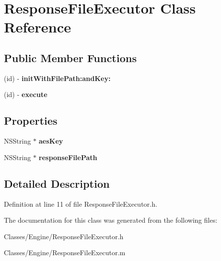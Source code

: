 \hypertarget{interface_response_file_executor}{
\section{ResponseFileExecutor Class Reference}
\label{interface_response_file_executor}
}
\subsection*{Public Member Functions}
\begin{DoxyCompactItemize}
\item 
\hypertarget{interface_response_file_executor_a017a61ea8b0cac97aa8ef94d6a5200d7}{
(id) -\/ {\bfseries initWithFilePath:andKey:}}
\label{interface_response_file_executor_a017a61ea8b0cac97aa8ef94d6a5200d7}

\item 
\hypertarget{interface_response_file_executor_a10369ed42c51e6334d90001418fc7cd1}{
(id) -\/ {\bfseries execute}}
\label{interface_response_file_executor_a10369ed42c51e6334d90001418fc7cd1}

\end{DoxyCompactItemize}
\subsection*{Properties}
\begin{DoxyCompactItemize}
\item 
\hypertarget{interface_response_file_executor_a50dd82b35ed099e4401b87f77552d767}{
NSString $\ast$ {\bfseries aesKey}}
\label{interface_response_file_executor_a50dd82b35ed099e4401b87f77552d767}

\item 
\hypertarget{interface_response_file_executor_a4ff4ee68056e7af595e36c34802843c3}{
NSString $\ast$ {\bfseries responseFilePath}}
\label{interface_response_file_executor_a4ff4ee68056e7af595e36c34802843c3}

\end{DoxyCompactItemize}


\subsection{Detailed Description}


Definition at line 11 of file ResponseFileExecutor.h.



The documentation for this class was generated from the following files:\begin{DoxyCompactItemize}
\item 
Classes/Engine/ResponseFileExecutor.h\item 
Classes/Engine/ResponseFileExecutor.m\end{DoxyCompactItemize}
